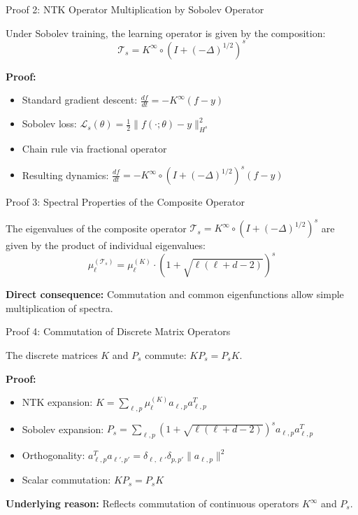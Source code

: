 \documentclass{beamer}
\begin{document}
\begin{frame}{Proof 2: NTK Operator Multiplication by Sobolev Operator}
\begin{theorem}
Under Sobolev training, the learning operator is given by the composition:
\[ \mathcal{T}_s = K^{\infty} \circ (I + (-\Delta)^{1/2})^s \]
\end{theorem}

\textbf{Proof:}
\begin{itemize}
\item Standard gradient descent: $\frac{df}{dt} = -K^{\infty}(f - y)$
\item Sobolev loss: $\mathcal{L}_s(\theta) = \frac{1}{2}\|f(\cdot; \theta) - y\|^2_{H^s}$
\item Chain rule via fractional operator
\item Resulting dynamics: $\frac{df}{dt} = -K^{\infty} \circ (I + (-\Delta)^{1/2})^s (f - y)$
\end{itemize}
\end{frame}

\begin{frame}{Proof 3: Spectral Properties of the Composite Operator}
\begin{theorem}
The eigenvalues of the composite operator $\mathcal{T}_s = K^{\infty} \circ (I + (-\Delta)^{1/2})^s$ are given by the product of individual eigenvalues:
\[ \mu_\ell^{(\mathcal{T}_s)} = \mu_\ell^{(K)} \cdot (1 + \sqrt{\ell(\ell + d - 2)})^s \]
\end{theorem}

\textbf{Direct consequence:} Commutation and common eigenfunctions allow simple multiplication of spectra.
\end{frame}

\begin{frame}{Proof 4: Commutation of Discrete Matrix Operators}
\begin{theorem}
The discrete matrices $K$ and $P_s$ commute: $KP_s = P_sK$.
\end{theorem}

\textbf{Proof:}
\begin{itemize}
\item NTK expansion: $K = \sum_{\ell,p} \mu_\ell^{(K)} a_{\ell,p} a_{\ell,p}^T$
\item Sobolev expansion: $P_s = \sum_{\ell,p} (1 + \sqrt{\ell(\ell + d - 2)})^s a_{\ell,p} a_{\ell,p}^T$
\item Orthogonality: $a_{\ell,p}^T a_{\ell',p'} = \delta_{\ell,\ell'} \delta_{p,p'} \|a_{\ell,p}\|^2$
\item Scalar commutation: $KP_s = P_sK$
\end{itemize}

\textbf{Underlying reason:} Reflects commutation of continuous operators $K^{\infty}$ and $P_s$.
\end{frame}
\end{document}
